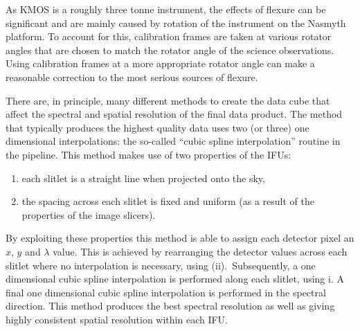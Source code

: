 As KMOS is a roughly three tonne instrument, the effects of flexure can be significant and are mainly caused by rotation of the instrument on the Nasmyth platform.
To account for this, calibration frames are taken at various rotator angles that are chosen to match the rotator angle of the science observations.
Using calibration frames at a more appropriate rotator angle can make a reasonable correction to the most serious sources of flexure.


There are, in principle, many different methods to create the data cube that affect the spectral and spatial resolution of the final data product.
The method that typically produces the highest quality data uses two (or three) one dimensional interpolations:
the so-called ``cubic spline interpolation'' routine in the pipeline.
This method makes use of two properties of the IFUs:

\begin{enumerate}
    \item each slitlet is a straight line when projected onto the sky,
    \item the spacing across each slitlet is fixed and uniform (as a result of the properties of the image slicers).
\end{enumerate}

By exploiting these properties this method is able to assign each detector pixel an $x$, $y$ and $\lambda$ value.
This is achieved by rearranging the detector values across each slitlet where no interpolation is necessary, using (ii).\footnotemark~Subsequently, a one dimensional cubic spline interpolation is performed along each slitlet, using i.
A final one dimensional cubic spline interpolation is performed in the spectral direction.
This method produces the best spectral resolution as well as giving highly consistent spatial resolution within each IFU.



